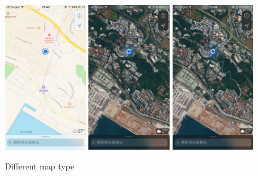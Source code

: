 \documentclass[12pt,a4paper]{article}
\begin{document}
                \begin{figure}
                    \includegraphics[width=0.32\textwidth]{4-1-2-a}
                    \includegraphics[width=0.32\textwidth]{4-1-2-b}
                    \includegraphics[width=0.32\textwidth]{4-1-2-c}
                    \centering
                    \caption{Different map type}
                    \label{fig:map-type}
                \end{figure}
                
\end{document}
